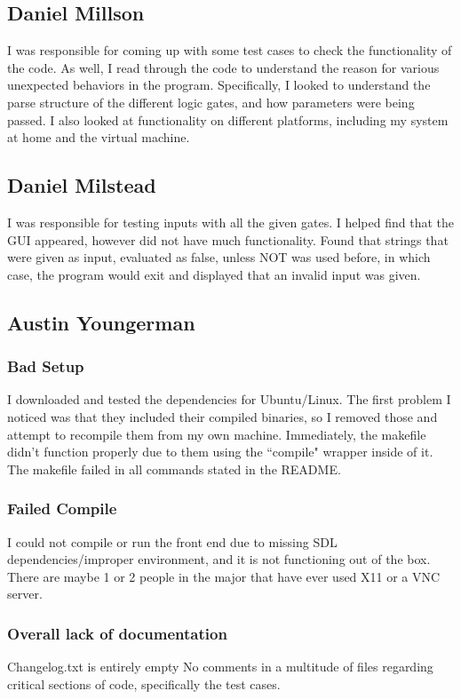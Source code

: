 \documentclass[11pt]{article}
\begin{document}
\subsection*{Daniel Millson}
    I was responsible for coming up with some test cases to check the functionality of the code. As well, I read through the code to understand the reason for various unexpected behaviors in the program. Specifically, I looked to understand the parse structure of the different logic gates, and how parameters were being passed. I also looked at functionality on different platforms, including my system at home and the virtual machine.
\subsection*{Daniel Milstead}
    I was responsible for testing inputs with all the given gates. I helped find that the GUI appeared, however did not have much functionality. Found that strings that were given as input, evaluated as false, unless NOT was used before, in which case, the program would exit and displayed that an invalid input was given.
\subsection*{Austin Youngerman}
    \subsubsection*{Bad Setup}
        I downloaded and tested the dependencies for Ubuntu/Linux. The first problem I noticed was that they included their compiled binaries, so I removed those and attempt to recompile them from my own machine.
        Immediately, the makefile didn't function properly due to them using the ``compile" wrapper inside of it. The makefile failed in all commands stated in the README.
    \subsubsection*{Failed Compile}
        I could not compile or run the front end due to missing SDL dependencies/improper environment, and it is not functioning out of the box. There are maybe 1 or 2 people in the major that have ever used X11 or a VNC server.
    \subsubsection*{Overall lack of documentation}
        Changelog.txt is entirely empty
        No comments in a multitude of files regarding critical sections of code, specifically the test cases.
\end{document}
